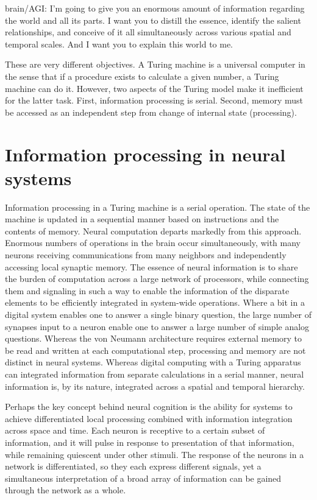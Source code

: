 \documentclass[twocolumn]{article}
\begin{document}
brain/AGI: I'm going to give you an enormous amount of information regarding the world and all its parts. I want you to distill the essence, identify the salient relationships, and conceive of it all simultaneously across various spatial and temporal scales. And I want you to explain this world to me.

These are very different objectives. A Turing machine is a universal computer in the sense that if a procedure exists to calculate a given number, a Turing machine can do it. However, two aspects of the Turing model make it inefficient for the latter task. First, information processing is serial. Second, memory must be accessed as an independent step from change of internal state (processing).

\section{\label{sec:neuroscience}Information processing in neural systems}
Information processing in a Turing machine is a serial operation. The state of the machine is updated in a sequential manner based on instructions and the contents of memory. Neural computation departs markedly from this approach. Enormous numbers of operations in the brain occur simultaneously, with many neurons receiving communications from many neighbors and independently accessing local synaptic memory. The essence of neural information is to share the burden of computation across a large network of processors, while connecting them and signaling in such a way to enable the information of the disparate elements to be efficiently integrated in system-wide operations. Where a bit in a digital system enables one to answer a single binary question, the large number of synapses input to a neuron enable one to answer a large number of simple analog questions. Whereas the von Neumann architecture requires external memory to be read and written at each computational step, processing and memory are not distinct in neural systems. Whereas digital computing with a Turing apparatus can integrated information from separate calculations in a serial manner, neural information is, by its nature, integrated across a spatial and temporal hierarchy.

Perhaps the key concept behind neural cognition is the ability for systems to achieve differentiated local processing combined with information integration across space and time. Each neuron is receptive to a certain subset of information, and it will pulse in response to presentation of that information, while remaining quiescent under other stimuli. The response of the neurons in a network is differentiated, so they each express different signals, yet a simultaneous interpretation of a broad array of information can be gained through the network as a whole. 
\end{document}
